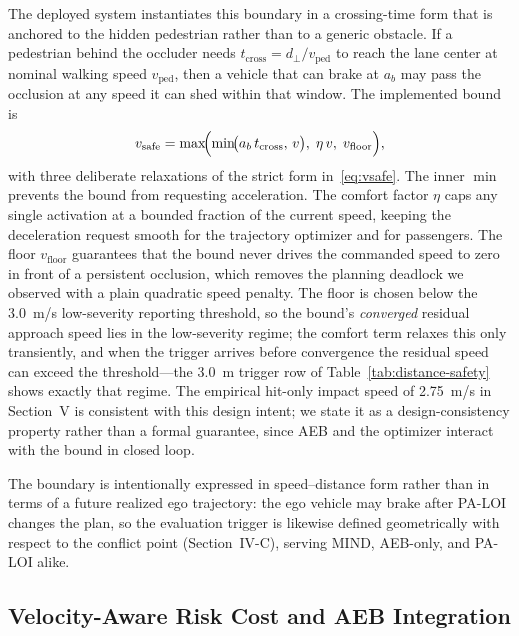 \documentclass[journal]{IEEEtran}
\begin{document}
The deployed system instantiates this boundary in a crossing-time form that is anchored to the hidden pedestrian rather than to a generic obstacle. If a pedestrian behind the occluder needs $t_{\mathrm{cross}} = d_\perp / v_{\mathrm{ped}}$ to reach the lane center at nominal walking speed $v_{\mathrm{ped}}$, then a vehicle that can brake at $a_b$ may pass the occlusion at any speed it can shed within that window. The implemented bound is
\begin{equation}
  v_{\mathrm{safe}} =
  \max\!\Bigl(
  \min\!\bigl(a_b\,t_{\mathrm{cross}},\, v\bigr),\;
  \eta\,v,\;
  v_{\mathrm{floor}}
  \Bigr),
  \label{eq:vsafe-impl}
\end{equation}
with three deliberate relaxations of the strict form in~\eqref{eq:vsafe}. The inner $\min$ prevents the bound from requesting acceleration. The comfort factor $\eta$ caps any single activation at a bounded fraction of the current speed, keeping the deceleration request smooth for the trajectory optimizer and for passengers. The floor $v_{\mathrm{floor}}$ guarantees that the bound never drives the commanded speed to zero in front of a persistent occlusion, which removes the planning deadlock we observed with a plain quadratic speed penalty. The floor is chosen below the \SI{3.0}{m/s} low-severity reporting threshold, so the bound's \emph{converged} residual approach speed lies in the low-severity regime; the comfort term relaxes this only transiently, and when the trigger arrives before convergence the residual speed can exceed the threshold---the \SI{3.0}{m} trigger row of Table~\ref{tab:distance-safety} shows exactly that regime. The empirical hit-only impact speed of \SI{2.75}{m/s} in Section~V is consistent with this design intent; we state it as a design-consistency property rather than a formal guarantee, since AEB and the optimizer interact with the bound in closed loop.

The boundary is intentionally expressed in speed--distance form rather than in terms of a future realized ego trajectory: the ego vehicle may brake after PA-LOI changes the plan, so the evaluation trigger is likewise defined geometrically with respect to the conflict point (Section~IV-C), serving MIND, AEB-only, and PA-LOI alike.

\subsection{Velocity-Aware Risk Cost and AEB Integration}
\end{document}
